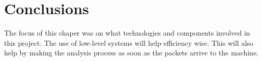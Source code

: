 \section{Conclusions}
\label{chap3:sec:concs}
The focus of this chaper was on what technologies and components involved in
this project.
The use of low-level systems will help efficiency wise. This will also help by
making the analysis process as soon as the packets arrive to the machine.
